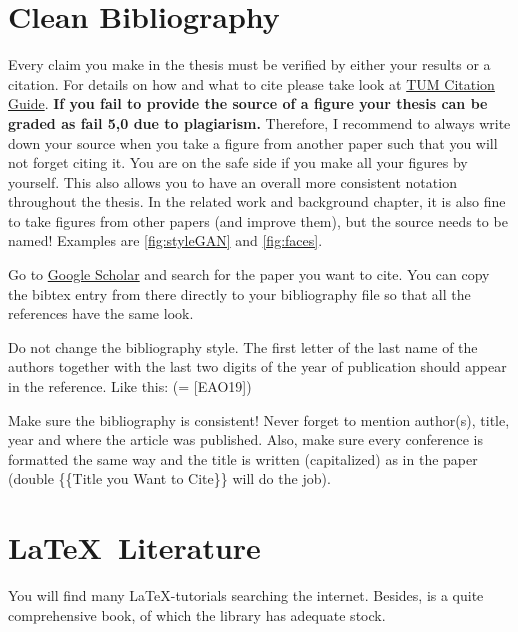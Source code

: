 \section{Clean Bibliography}

Every claim you make in the thesis must be verified by either your results or a citation. For details on how and what to cite please take look at \href{https://www.ub.tum.de/en/citation-guide}{TUM Citation Guide}. \textbf{If you fail to provide the source of a figure your thesis can be graded as fail 5,0 due to plagiarism.} Therefore, I recommend to always write down your source when you take a figure from another paper such that you will not forget citing it. You are on the safe side if you make all your figures by yourself. This also allows you to have an overall more consistent notation throughout the thesis. In the related work and background chapter, it is also fine to take figures from other papers (and improve them), but the source needs to be named! Examples are \autoref{fig:styleGAN} and \autoref{fig:faces}.

Go to \href{https://scholar.google.com/}{Google Scholar} and search for the paper you want to cite. You can copy the bibtex entry from there directly to your bibliography file so that all the references have the same look. 

Do not change the bibliography style. The first letter of the last name of the authors together with the last two digits of the year of publication should appear in the reference. Like this: \cite{baseline1} (= [EAO19])

Make sure the bibliography is consistent!
Never forget to mention author(s), title, year and where the article was published. Also, make sure every conference is formatted the same way and the title is written (capitalized) as in the paper (double \{\{Title you Want to Cite\}\} will do the job).

\section{\LaTeX\ Literature}
\label{sec:literature}
You will find many \LaTeX-tutorials searching the internet. Besides,   \cite{Ko03} is a quite comprehensive book, of which the library has adequate stock.